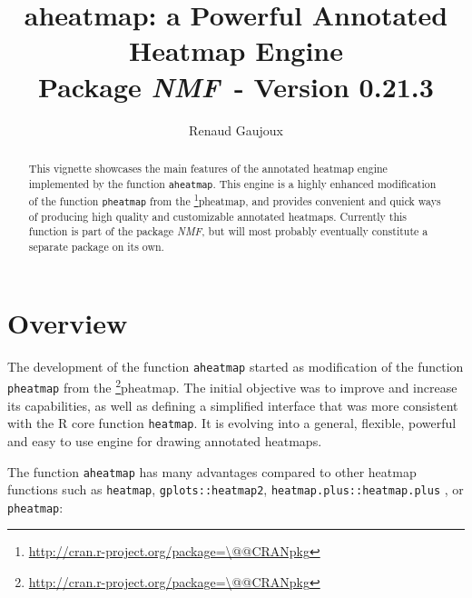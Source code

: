 \documentclass[a4paper]{article}\usepackage[]{graphicx}\usepackage[]{color}
\makeatletter
\let\code=\texttt
\newcommand{\pkgname}[1]{\textit{#1}\xspace}
\newcommand{\CRANurl}[1]{\url{http://cran.r-project.org/package=#1}}
\def\CRANpkg{\@ifstar\@CRANpkg\@@CRANpkg}
\def\@CRANpkg#1{\href{http://cran.r-project.org/package=#1}{\pkgname{#1}}\footnote{\CRANurl{#1}}}
\def\@@CRANpkg#1{\href{http://cran.r-project.org/package=#1}{\pkgname{#1}} package\footnote{\CRANurl{#1}}}
\newcommand{\nmfpack}{\pkgname{NMF}}
\makeatother
\begin{document}
\title{aheatmap: a Powerful Annotated Heatmap Engine\\
\small Package \nmfpack\ - Version 0.21.3}
\author{Renaud Gaujoux}

\maketitle

\begin{abstract}
This vignette showcases the main features of the annotated heatmap engine
implemented by the function \code{aheatmap}.
This engine is a highly enhanced modification of the function \code{pheatmap}
from the \CRANpkg{pheatmap}, and provides convenient and quick ways of producing high quality and customizable annotated heatmaps.
Currently this function is part of the package \nmfpack, but will most
probably eventually constitute a separate package on its own.
\end{abstract}

{\small \tableofcontents}

\section{Overview}

The development of the function \code{aheatmap} started as modification of the
function \code{pheatmap} from the \CRANpkg{pheatmap}. 
The initial objective was to improve and increase its capabilities, as well as 
defining a simplified interface that was more consistent with the R core
function \code{heatmap}.
It is evolving into a general, flexible, powerful and easy to use engine for
drawing annotated heatmaps.
  
The function \code{aheatmap} has many advantages compared to other heatmap functions 
such as \code{heatmap}, \code{gplots::heatmap2}, \code{heatmap.plus::heatmap.plus} 
, or \code{pheatmap}:
\end{document}
